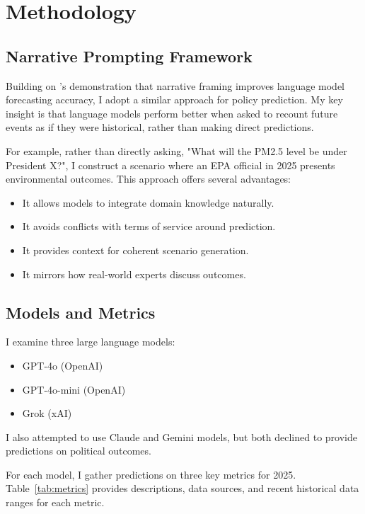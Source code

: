 \section{Methodology}\label{sec:methodology}

\subsection{Narrative Prompting Framework}

Building on \cite{cunningham2024base}'s demonstration that narrative framing improves language model forecasting accuracy, I adopt a similar approach for policy prediction. My key insight is that language models perform better when asked to recount future events as if they were historical, rather than making direct predictions.

For example, rather than directly asking, "What will the PM2.5 level be under President X?", I construct a scenario where an EPA official in 2025 presents environmental outcomes. This approach offers several advantages:

\begin{itemize}
    \item It allows models to integrate domain knowledge naturally.
    \item It avoids conflicts with terms of service around prediction.
    \item It provides context for coherent scenario generation.
    \item It mirrors how real-world experts discuss outcomes.
\end{itemize}

\subsection{Models and Metrics}

I examine three large language models:
\begin{itemize}
    \item GPT-4o (OpenAI)
    \item GPT-4o-mini (OpenAI)
    \item Grok (xAI)
\end{itemize}

I also attempted to use Claude and Gemini models, but both declined to provide predictions on political outcomes.

For each model, I gather predictions on three key metrics for 2025. Table~\ref{tab:metrics} provides descriptions, data sources, and recent historical data ranges for each metric.

